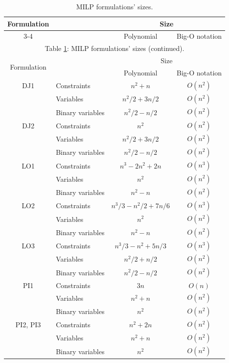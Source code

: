 \documentclass{article}
\begin{document}
\begin{longtable}{c l c c} %
\caption{MILP formulations' sizes.\label{tab:sizes}} \\
%
\hline
\multirow{2}{*}[-0.3 em]{Formulation} & & \multicolumn{2}{c}{Size} \\
\cmidrule{3-4}
& & Polynomial & Big-O notation \\
\hline
\endfirsthead
%
\multicolumn{4}{c}{Table \ref{tab:sizes}: MILP formulations' sizes (continued).} \\ [0.5em]
%
\hline
\multirow{2}{*}[-0.3 em]{Formulation} & & \multicolumn{2}{c}{Size} \\
\cmidrule{3-4}
& & Polynomial & Big-O notation \\
\hline
\endhead
%
\hline
\endfoot
%
DJ1 & Constraints & $n^2 + n$ & $O(n^2)$ \\
& Variables & $n^2/2 + 3n/2$ & $O(n^2)$ \\
& Binary variables & $n^2/2 - n/2$ & $O(n^2)$ \\
DJ2 & Constraints & $n^2$ & $O(n^2)$ \\
& Variables & $n^2/2 + 3n/2$ & $O(n^2)$ \\
& Binary variables & $n^2/2 - n/2$ & $O(n^2)$ \\
LO1 & Constraints & $n^3 - 2n^2 + 2n$ & $O(n^3)$ \\
& Variables & $n^2$ & $O(n^2)$ \\
& Binary variables & $n^2 - n$ & $O(n^2)$ \\
LO2 & Constraints & $n^3/3 - n^2/2 + 7n/6$ & $O(n^3)$ \\
& Variables & $n^2$ & $O(n^2)$ \\
& Binary variables & $n^2 - n$ & $O(n^2)$ \\
LO3 & Constraints & $n^3/3 - n^2 + 5n/3$ & $O(n^3)$ \\
& Variables & $n^2/2 + n/2$ & $O(n^2)$ \\
& Binary variables & $n^2/2 - n/2$ & $O(n^2)$ \\
PI1 & Constraints & $3n$ & $O(n)$ \\
& Variables & $n^2 + n$ & $O(n^2)$ \\
& Binary variables & $n^2$ & $O(n^2)$ \\
PI2, PI3 & Constraints & $n^2 + 2n$ & $O(n^2)$ \\
& Variables & $n^2 + n$ & $O(n^2)$ \\
& Binary variables & $n^2$ & $O(n^2)$ \\

\end{longtable}
\end{document}
